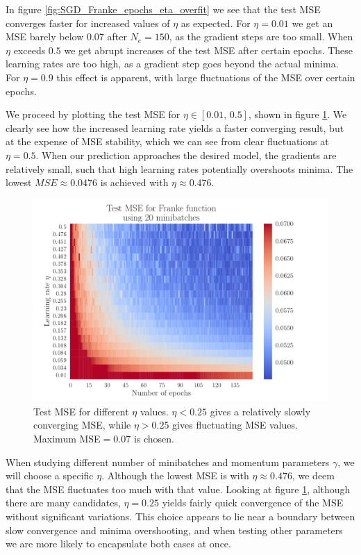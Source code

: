 \documentclass[12pt]{extarticle}
\begin{document}
In figure \ref{fig:SGD_Franke_epochs_eta_overfit} we see that the test MSE converges faster for increased values of $\eta$ as expected. For $\eta=0.01$ we get an MSE barely below $0.07$ after $N_e=150$, as the gradient steps are too small. When $\eta$ exceeds $0.5$ we get abrupt increases of the test MSE after certain epochs. These learning rates are too high, as a gradient step goes beyond the actual minima. For $\eta=0.9$ this effect is apparent, with large fluctuations of the MSE over certain epochs.

We proceed by plotting the test MSE for $\eta\in[0.01,\,0.5]$, shown in figure \ref{fig:SGD_Franke_epochs_eta}. We clearly see how the increased learning rate yields a faster converging result, but at the expense of MSE stability, which we can see from clear fluctuations at $\eta=0.5$. When our prediction approaches the desired model, the gradients are relatively small, such that high learning rates potentially overshoots minima. The lowest $MSE \approx 0.0476$ is achieved with $\eta\approx0.476$.

\begin{figure}[h!]
	\includegraphics[width=0.9\linewidth]{SGD_Franke/reg_Franke__epochs_eta__Test_MSE__262224.pdf}
	\caption{Test MSE for different $\eta$ values. $\eta<0.25$ gives a relatively slowly converging MSE, while $\eta>0.25$ gives fluctuating MSE values. Maximum MSE$=0.07$ is chosen.}
	\label{fig:SGD_Franke_epochs_eta}
\end{figure}

When studying different number of minibatches and momentum parameters $\gamma$, we will choose a specific $\eta$. Although the lowest MSE is with $\eta\approx0.476$, we deem that the MSE fluctuates too much with that value. Looking at figure \ref{fig:SGD_Franke_epochs_eta}, although there are many candidates, $\eta=0.25$ yields fairly quick convergence of the MSE without significant variations. This choice appears to lie near a boundary between slow convergence and minima overshooting, and when testing other parameters we are more likely to encapsulate both cases at once.
\end{document}
